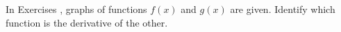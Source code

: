 {\noindent In Exercises}
{, graphs of functions $f(x)$ and $g(x)$ are given. Identify which function is the derivative of the other.
}
